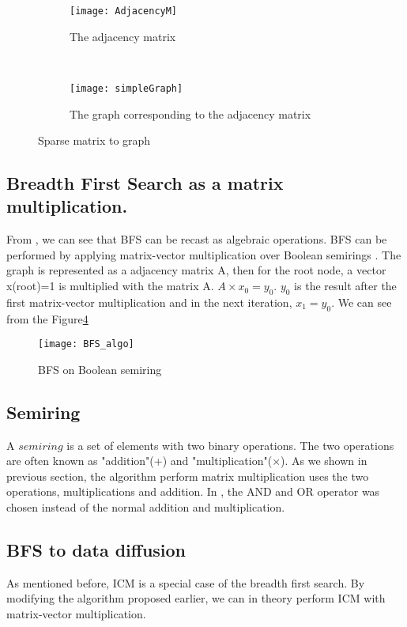 {\begin{figure}
	\begin{subfigure}{0.5\textwidth}
	\texttt{[image: AdjacencyM]}
	\caption{The adjacency matrix}
	\label{fig:AdjacencyM}
	\end{subfigure}
	~
	\begin{subfigure}{0.5\textwidth}
	\texttt{[image: simpleGraph]}
	\caption{The graph corresponding to the adjacency matrix}
	\label{fig:matrix}
	\end{subfigure}
 	\caption{Sparse matrix to graph}
 	\label{AdjaToMatrix}
\end{figure}

\subsection{Breadth First Search as a matrix multiplication.} \label{BFS as Matrix}
From  \cite{AlgoToMath}, we can see that BFS can be recast as algebraic operations. BFS can be performed by applying matrix-vector multiplication over Boolean semirings \cite{HybridBFS2015}. The graph is represented as a adjacency matrix A, then for the root node, a vector x(root)=1 is multiplied with the matrix A. $A \times x_0 = y_0$. $y_0$ is the result after the first matrix-vector multiplication and in the next iteration, $x_1 = y_0$. We can see from the Figure\ref{fig:bfsMatrix}

\begin{figure}
	
	\texttt{[image: BFS\_algo]}
	\caption{BFS on Boolean semiring}
	\label{fig:bfsMatrix}
\end{figure}



\subsection{Semiring}
A $semiring$ is a set of elements with two binary operations. The two operations are often known as "addition"(+) and "multiplication"($\times$).  As we shown in previous section, the algorithm perform matrix multiplication uses the two operations, multiplications and addition. In  \cite{HybridBFS2015}, the AND and OR operator was chosen instead of the normal addition and multiplication. 


\subsection{BFS to data diffusion}
As mentioned before, ICM is a special case of the breadth first search. By modifying the algorithm proposed earlier, we can in theory perform ICM with matrix-vector multiplication.  

}
